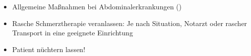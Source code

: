 %
\label{m:gallenkolik}%
\begin{itemize}
  \item Allgemeine Maßnahmen bei Abdominalerkrankungen
  ()
  \item Rasche Schmerztherapie veranlassen: Je nach
  Situation, Notarzt oder rascher Transport in eine
  geeignete Einrichtung
  \item Patient nüchtern lassen!
\end{itemize}